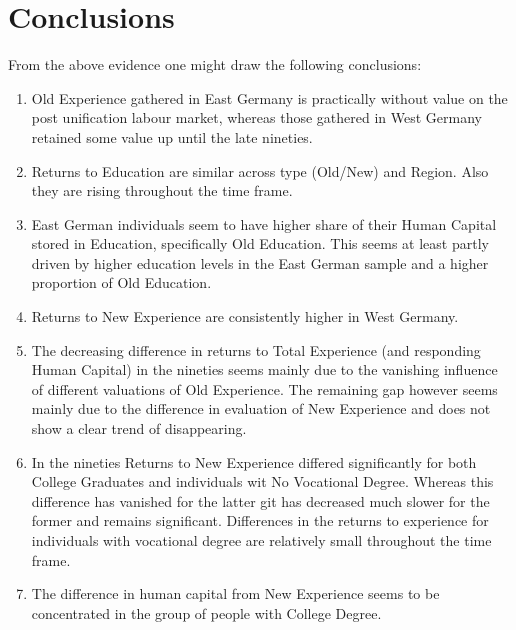 \documentclass{article}
\begin{document}
\section{Conclusions}
From the above evidence one might draw the following conclusions:
\begin{enumerate}
	\item Old Experience gathered in East Germany is practically without value on the post unification labour market, whereas those gathered in West Germany retained some value up until the late nineties.
	\item Returns to Education are similar across type (Old/New) and Region. Also they are rising throughout the time frame.
	\item East German individuals seem to have higher share of their Human Capital stored in Education, specifically Old Education. This seems at least partly driven by higher education levels in the East German sample and a higher proportion of Old Education.
	\item Returns to New Experience are consistently higher in West Germany. 
	\item The decreasing difference in returns to Total Experience (and responding Human Capital) in the nineties seems mainly due to the vanishing influence of different valuations of Old Experience. The remaining gap however seems mainly due to the difference in evaluation of New Experience and does not show a clear trend of disappearing.
	\item In the nineties Returns to New Experience differed significantly for both College Graduates and individuals wit No Vocational Degree. Whereas this difference has vanished for the latter git has decreased much slower for the former and remains significant. Differences in the returns to experience for individuals with vocational degree are relatively small throughout the time frame.
	\item The difference in human capital from New Experience seems to be concentrated in the group of people with College Degree.
\end{enumerate}

\end{document}
